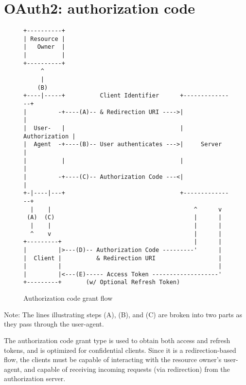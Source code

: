 \section{OAuth2: authorization code}
\label{sec:auth-code}
\begin{figure}[h]
    \centering
    \begin{BVerbatim}
+----------+
| Resource |
|   Owner  |
|          |
+----------+
     ^
     |
    (B)
+----|-----+          Client Identifier      +---------------+
|         -+----(A)-- & Redirection URI ---->|               |
|  User-   |                                 | Authorization |
|  Agent  -+----(B)-- User authenticates --->|     Server    |
|          |                                 |               |
|         -+----(C)-- Authorization Code ---<|               |
+-|----|---+                                 +---------------+
  |    |                                         ^      v
 (A)  (C)                                        |      |
  |    |                                         |      |
  ^    v                                         |      |
+---------+                                      |      |
|         |>---(D)-- Authorization Code ---------'      |
|  Client |          & Redirection URI                  |
|         |                                             |
|         |<---(E)----- Access Token -------------------'
+---------+       (w/ Optional Refresh Token)
    \end{BVerbatim}
    \caption{Authorization code grant flow \cite{ietf-oauth}}
    \label{fig:authorization-code-grant-flow}
\end{figure}
Note: The lines illustrating steps (A), (B), and (C) are broken into
two parts as they pass through the user-agent.


The authorization code grant type is used to obtain both access and refresh
tokens, and is optimized for confidential clients.
Since it is a redirection-based flow, the clients must be capable of interacting
with the resource owner's user-agent, and capable of receiving incoming requests
(via redirection) from the authorization server.

